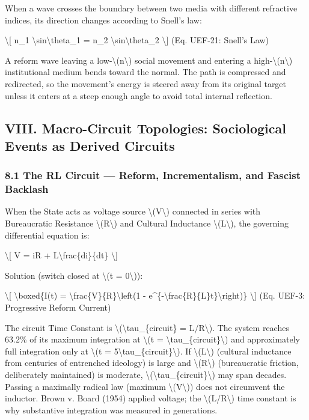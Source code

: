 {When a wave crosses the boundary between two media with different refractive indices, its direction changes according to Snell's law:

\textbackslash{[}
n_1 \textbackslash sin\textbackslash theta_1 = n_2 \textbackslash sin\textbackslash theta_2
\label{eq:uef-21}
\textbackslash{]} {(Eq. UEF-21: Snell's Law)}

A reform wave leaving a low-\textbackslash(n\textbackslash) social movement and entering a high-\textbackslash(n\textbackslash) institutional medium bends toward the normal. The path is compressed and redirected, so the movement's energy is steered away from its original target unless it enters at a steep enough angle to avoid total internal reflection.

\protect{}\label{sec-circuit-topologies}
\subsection{VIII. Macro-Circuit Topologies: Sociological Events as
Derived
Circuits}\label{viii.-macro-circuit-topologies-sociological-events-as-derived-circuits}

\subsubsection{8.1 The RL Circuit --- Reform, Incrementalism, and
Fascist
Backlash}\label{the-rl-circuit-reform-incrementalism-and-fascist-backlash}

When the State acts as voltage source \textbackslash(V\textbackslash)
connected in series with Bureaucratic Resistance
\textbackslash(R\textbackslash) and Cultural Inductance
\textbackslash(L\textbackslash), the governing differential equation is:

\textbackslash{[} V = iR + L\textbackslash frac\{di\}\{dt\}
\textbackslash{]}

Solution (switch closed at \textbackslash(t = 0\textbackslash)):

\textbackslash{[} \textbackslash boxed\{I(t) =
\textbackslash frac\{V\}\{R\}\textbackslash left(1 -
e\^{}\{-\textbackslash frac\{R\}\{L\}t\}\textbackslash right)\}
\textbackslash{]} {(Eq. UEF-3: Progressive Reform Current)}

The circuit Time Constant is
\textbackslash(\textbackslash tau\_\{circuit\} = L/R\textbackslash). The
system reaches 63.2\% of its maximum integration at \textbackslash(t =
\textbackslash tau\_\{circuit\}\textbackslash) and approximately full
integration only at \textbackslash(t =
5\textbackslash tau\_\{circuit\}\textbackslash). If
\textbackslash(L\textbackslash) (cultural inductance from centuries of
entrenched ideology) is large and \textbackslash(R\textbackslash)
(bureaucratic friction, deliberately maintained) is moderate,
\textbackslash(\textbackslash tau\_\{circuit\}\textbackslash) may span
decades. Passing a maximally radical law (maximum
\textbackslash(V\textbackslash)) does not circumvent the inductor. Brown
v. Board (1954) applied voltage; the \textbackslash(L/R\textbackslash)
time constant is why substantive integration was measured in
generations.

}
